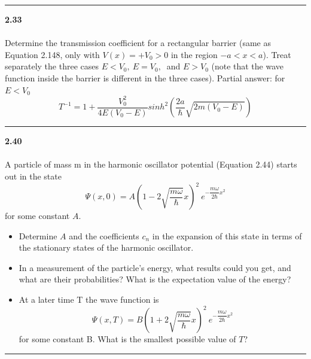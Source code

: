 \documentclass[fleqn]{article}
\begin{document}
  \rule{15cm}{1pt}
  
  \textbf{2.33} \\ \\
  Determine the transmission coefficient for a rectangular barrier
  (same as Equation 2.148, only with $V(x)=+V_0 >0$ in the region $-a<x<a$).
  Treat separately the three cases $E<V_0, ~ E=V_0, ~ $ and $E>V_0$ 
  (note that the wave function inside the barrier is different in the three cases).
  Partial answer: for $E<V_0$
  $$T^{-1}=1+\dfrac{V^2_0}{4E(V_0-E)} sinh^2 \left(\dfrac{2a}{\hbar} \sqrt{2m(V_0-E)}\right)$$


  \rule{15cm}{1pt}
  
  \textbf{2.40} \\ \\
  A particle of mass m in the harmonic oscillator potential (Equation
  2.44) starts out in the state
  $$\Psi(x,0)=A \left(1-2\sqrt{\dfrac{m \omega}{\hbar}}x\right)^2 ~ e^{-\dfrac{m\omega}{2\hbar} x^2}$$
  for some constant $A$.
  \begin{itemize}
    \item Determine $A$ and the coefficients $c_n$ in the expansion of this state in terms
    of the stationary states of the harmonic oscillator.

    \item In a measurement of the particle’s energy, what results could you get, and
    what are their probabilities? What is the expectation value of the energy?

    \item At a later time T the wave function is
    $$\Psi(x,T)=B\left(1+2\sqrt{\dfrac{m \omega}{\hbar}}x\right)^2 ~ e^{-\dfrac{m\omega}{2\hbar} x^2}$$
    for some constant B. What is the smallest possible value of $T$?
  \end{itemize}


  \rule{15cm}{1pt}
  
\end{document}

